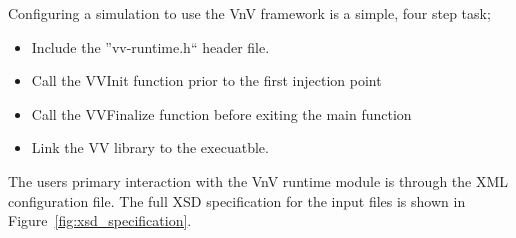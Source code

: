 Configuring a simulation to use the VnV framework is a simple, four step task;

\begin{itemize}
 \item Include the ''vv-runtime.h`` header file.
 \item Call the VVInit function prior to the first injection point
 \item Call the VVFinalize function before exiting the main function
 \item Link the VV library to the execuatble. 
\end{itemize}

The users primary interaction with the VnV runtime module is through the XML configuration file. The full XSD specification for the input 
files is shown in Figure~\ref{fig:xsd_specification}. 

